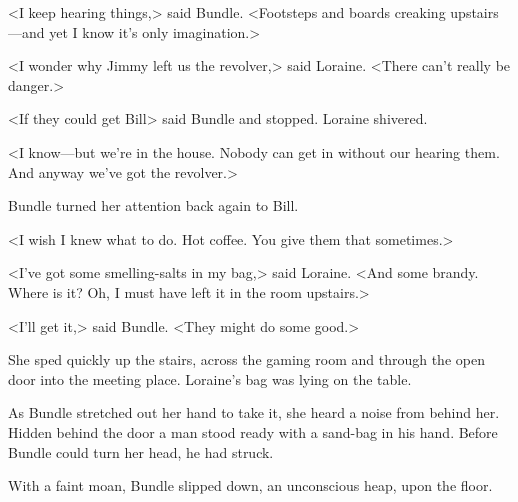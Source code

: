 <I keep hearing things,> said Bundle. <Footsteps and boards creaking upstairs—and yet I know it's only imagination.>

<I wonder why Jimmy left us the revolver,> said Loraine. <There can't really be danger.>

<If they could get Bill\longdash> said Bundle and stopped. Loraine shivered.

<I know—but we're in the house. Nobody can get in without our hearing them. And anyway we've got the revolver.>

Bundle turned her attention back again to Bill.

<I wish I knew what to do. Hot coffee. You give them that sometimes.>

<I've got some smelling-salts in my bag,> said Loraine. <And some brandy. Where is it? Oh, I must have left it in the room upstairs.>

<I'll get it,> said Bundle. <They might do some good.>

She sped quickly up the stairs, across the gaming room and through the open door into the meeting place. Loraine's bag was lying on the table.

As Bundle stretched out her hand to take it, she heard a noise from behind her. Hidden behind the door a man stood ready with a sand-bag in his hand. Before Bundle could turn her head, he had struck.

With a faint moan, Bundle slipped down, an unconscious heap, upon the floor.